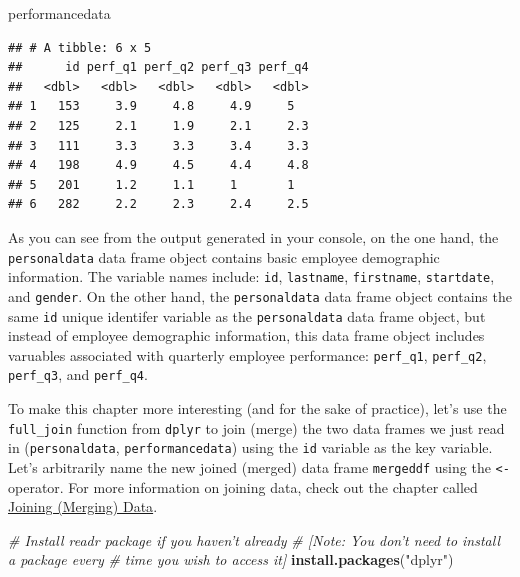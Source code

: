 \documentclass[]{book}
\newenvironment{Shaded}{\begin{snugshade}}{\end{snugshade}}
\newcommand{\KeywordTok}[1]{\textcolor[rgb]{0.13,0.29,0.53}{\textbf{#1}}}
\newcommand{\StringTok}[1]{\textcolor[rgb]{0.31,0.60,0.02}{#1}}
\newcommand{\CommentTok}[1]{\textcolor[rgb]{0.56,0.35,0.01}{\textit{#1}}}
\newcommand{\NormalTok}[1]{#1}
\begin{document}
\begin{Shaded}
\begin{Highlighting}[]
\NormalTok{performancedata}
\end{Highlighting}
\end{Shaded}

\begin{verbatim}
## # A tibble: 6 x 5
##      id perf_q1 perf_q2 perf_q3 perf_q4
##   <dbl>   <dbl>   <dbl>   <dbl>   <dbl>
## 1   153     3.9     4.8     4.9     5  
## 2   125     2.1     1.9     2.1     2.3
## 3   111     3.3     3.3     3.4     3.3
## 4   198     4.9     4.5     4.4     4.8
## 5   201     1.2     1.1     1       1  
## 6   282     2.2     2.3     2.4     2.5
\end{verbatim}

As you can see from the output generated in your console, on the one
hand, the \texttt{personaldata} data frame object contains basic
employee demographic information. The variable names include:
\texttt{id}, \texttt{lastname}, \texttt{firstname}, \texttt{startdate},
and \texttt{gender}. On the other hand, the \texttt{personaldata} data
frame object contains the same \texttt{id} unique identifer variable as
the \texttt{personaldata} data frame object, but instead of employee
demographic information, this data frame object includes varuables
associated with quarterly employee performance: \texttt{perf\_q1},
\texttt{perf\_q2}, \texttt{perf\_q3}, and \texttt{perf\_q4}.

To make this chapter more interesting (and for the sake of practice),
let's use the \texttt{full\_join} function from \texttt{dplyr} to join
(merge) the two data frames we just read in (\texttt{personaldata},
\texttt{performancedata}) using the \texttt{id} variable as the key
variable. Let's arbitrarily name the new joined (merged) data frame
\texttt{mergeddf} using the \texttt{\textless{}-} operator. For more
information on joining data, check out the chapter called
\protect\hyperlink{join}{Joining (Merging) Data}.

\begin{Shaded}
\begin{Highlighting}[]
\CommentTok{# Install readr package if you haven't already}
\CommentTok{# [Note: You don't need to install a package every }
\CommentTok{# time you wish to access it]}
\KeywordTok{install.packages}\NormalTok{(}\StringTok{"dplyr"}\NormalTok{)}
\end{Highlighting}
\end{Shaded}
\end{document}
